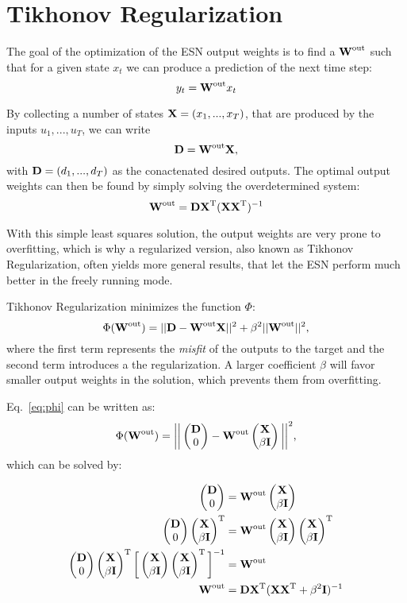 \section{Tikhonov Regularization}
\label{sec:tikhonov_regularization}
The goal of the optimization of the ESN output weights is to find a $\wmatr{out}$
such that for a given state $x_t$ we can produce a prediction of the next time step:
\begin{equation}
  y_t = \wmatr{out} x_t
\end{equation}

By collecting a number of states $ \matr{X} = (x_1, ..., x_T)$, that are produced by the inputs
$u_1, ..., u_T$, we can write
\begin{equation}
  \matr{D} = \wmatr{out} \matr{X},
\end{equation}
with $\matr{D} = (d_1, ..., d_T)$ as the conactenated desired outputs.
The optimal output weights can then be found by simply solving the overdetermined
system:
\begin{equation}
  \wmatr{out} = \matr{D} \XT (\matr{X} \XT)^{-1}
\end{equation}

With this simple least squares solution, the output weights are very prone to
overfitting, which is why a regularized version, also known as Tikhonov Regularization,
often yields more general results, that let the ESN perform much better in the
freely running mode.

Tikhonov Regularization minimizes the function $\Phi$:
\begin{equation}
  \label{eq:phi}
  \Phi(\wmatr{out}) = || \matr{D} - \wmatr{out} \matr{X} ||^2
                      + \beta^2 || \wmatr{out} ||^2,
\end{equation}
where the first term represents the \emph{misfit} of the outputs to the target
and the second term introduces a the regularization.
A larger coefficient $\beta$ will favor smaller output weights in the solution,
which prevents them from overfitting.

Eq.~\ref{eq:phi} can be written as:
\begin{equation}
  \Phi(\wmatr{out}) = \bigg | \bigg| 
                      \vect{\matr{D}}{0}
                    - \wmatr{out} \vect{\matr{X}}{\beta \matr{I}}
                      \bigg | \bigg| ^2,
\end{equation}
which can be solved by:

\begin{align}
  \vect{\matr{D}}{0} &= \wmatr{out} \XbI \\
  \vect{\matr{D}}{0} \XbI^{\text{T}} &= \wmatr{out} \XbI \XbI^{\text{T}}\\
  \vect{\matr{D}}{0} \XbI^{\text{T}} \bigg[\XbI \XbI^{\text{T}}\bigg]^{-1} &= \wmatr{out} \\
  \wmatr{out} &= \matr{D} \XT (\matr{X}\XT + \beta^2 \matr{I})^{-1}
\end{align}
